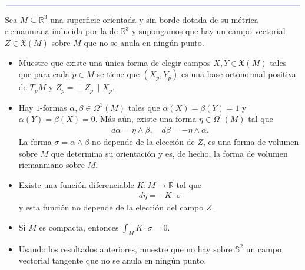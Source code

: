 \documentclass[11pt]{article}
\newcommand{\R}{\mathbb{R}}
\newcommand{\Ss}{\mathbb{S}}
\newcommand{\X}{\mathfrak{X}}
\newcommand{\paint}[1]{\color{color}{#1}}
\newcommand{\paintline}{\begin{center}
$\paint{
\rule{400pt}{0.5pt}
}$
\vspace{10pt}
\end{center}}
\newenvironment{exercise}[2][Ejercicio]{\begin{trivlist}
\item[\hskip \labelsep \paint{{\bfseries #1}}\hskip \labelsep {\bfseries #2.}]}{\end{trivlist}}
\begin{document}
\paintline
\newpage
\begin{exercise}{7} Sea $M \subseteq \R^3$ una superficie orientada y sin borde dotada de su métrica riemanniana inducida por la de $\R^3$ y supongamos que hay un campo vectorial $Z \in \X(M)$ sobre $M$ que no se anula en ningún punto.
\begin{itemize}[listparindent = \parindent]
\item[(a)] Muestre que existe una única forma de elegir campos $X,Y \in \X(M)$ tales que para cada $p \in M$ se tiene que $(X_p,Y_p)$ es una base ortonormal positiva de $T_pM$ y $Z_p = \|Z_p\|X_p$. 
\item[(b)] Hay $1$-formas $\alpha,\beta\in \Omega^1(M)$ tales que $\alpha(X) = \beta(Y) = 1$ y $\alpha(Y) = \beta(X) = 0$. Más aún, existe una forma $\eta \in \Omega^1(M)$ tal que
\begin{align*}
d\alpha = \eta \wedge \beta, \quad d\beta = -\eta \wedge \alpha.
\end{align*}
La forma $\sigma  = \alpha \wedge \beta$ no depende de la elección de $Z$, es una forma de volumen sobre $M$ que determina su orientación y es, de hecho, la forma de volumen riemanniano sobre $M$.
\item[(c)] Existe una función diferenciable $K : M \to \R$ tal que
\begin{align*}
d\eta = -K \cdot \sigma
\end{align*}
y esta función no depende de la elección del campo $Z$.
\item[(d)] Si $M$ es compacta, entonces $\int_M K \cdot \sigma = 0$.
\item[(e)] Usando los resultados anteriores, muestre que no hay sobre $\Ss^2$ un campo vectorial tangente que no se anula en ningún punto.
\end{itemize}
\end{exercise}
\end{document}
